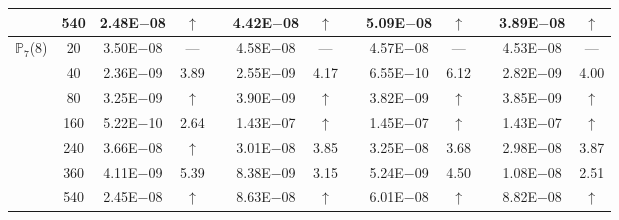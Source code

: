 \begin{table}[H]
{\begin{tabular}{@{}l c c c c c c c c c c c c@{}}
 & 540 & 2.48E$-$08 & $\uparrow$  &  & 4.42E$-$08 & $\uparrow$ &  & 5.09E$-$08 & $\uparrow$ &  & 3.89E$-$08 & $\uparrow$\\
\midrule
\multirow{7}{*}{$\mathbb{P}_{7}$(8)}
 & 20 & 3.50E$-$08 & ---  &  & 4.58E$-$08 & --- &  & 4.57E$-$08 & --- &  & 4.53E$-$08 & ---\\
 & 40 & 2.36E$-$09 & 3.89  &  & 2.55E$-$09 & 4.17 &  & 6.55E$-$10 & 6.12 &  & 2.82E$-$09 & 4.00\\
 & 80 & 3.25E$-$09 & $\uparrow$  &  & 3.90E$-$09 & $\uparrow$ &  & 3.82E$-$09 & $\uparrow$ &  & 3.85E$-$09 & $\uparrow$\\
 & 160 & 5.22E$-$10 & 2.64  &  & 1.43E$-$07 & $\uparrow$ &  & 1.45E$-$07 & $\uparrow$ &  & 1.43E$-$07 & $\uparrow$\\
 & 240 & 3.66E$-$08 & $\uparrow$  &  & 3.01E$-$08 & 3.85 &  & 3.25E$-$08 & 3.68 &  & 2.98E$-$08 & 3.87\\
 & 360 & 4.11E$-$09 & 5.39  &  & 8.38E$-$09 & 3.15 &  & 5.24E$-$09 & 4.50 &  & 1.08E$-$08 & 2.51\\
 & 540 & 2.45E$-$08 & $\uparrow$  &  & 8.63E$-$08 & $\uparrow$ &  & 6.01E$-$08 & $\uparrow$ &  & 8.82E$-$08 & $\uparrow$\\
\bottomrule
\end{tabular}}
\label{PRO:bending:02_02_glob6v2}
\end{table}
